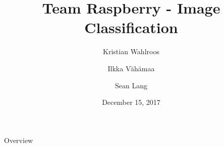 \documentclass{beamer}
\title{Team Raspberry - Image Classification}
\author{Kristian Wahlroos \and Ilkka Vähämaa \and Sean Lang}
\date{December 15, 2017}
\begin{document}
\maketitle

\begin{frame}{Overview}
\tableofcontents
\end{frame}








\end{document}

